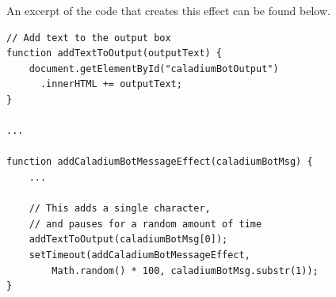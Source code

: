 An excerpt of the code that creates this effect can be found below.

\begin{lstlisting}
// Add text to the output box
function addTextToOutput(outputText) {
    document.getElementById("caladiumBotOutput")
      .innerHTML += outputText;
}

...

function addCaladiumBotMessageEffect(caladiumBotMsg) {
    ...

    // This adds a single character,
    // and pauses for a random amount of time
    addTextToOutput(caladiumBotMsg[0]);
    setTimeout(addCaladiumBotMessageEffect,
        Math.random() * 100, caladiumBotMsg.substr(1));
}
\end{lstlisting}
